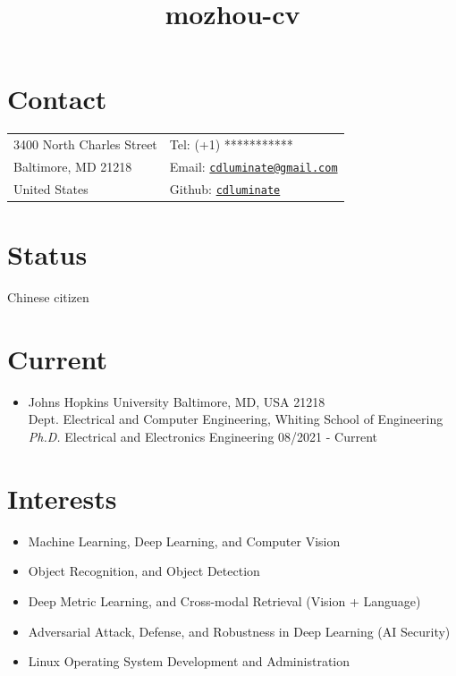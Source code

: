 \documentclass[10pt,margin,line,pifont,palatino,courier]{res}
\newcommand{\email}[1]{\href{mailto:#1}{\tt #1}}
\begin{document}
\title{mozhou-cv}
\begin{resume}

\section{\sc Contact}

\vspace{.05in}
\begin{tabular}{@{}p{2.2in}p{2.2in}}
3400 North Charles Street & Tel: (+1) *********** \\
Baltimore, MD 21218       & Email: \email{cdluminate@gmail.com}\\
United States	          & Github: \href{https://github.com/cdluminate}{\tt cdluminate}
\end{tabular}

\section{\sc Status}
Chinese citizen

\section{\sc Current}

\begin{itemize}[leftmargin=*]
\item Johns Hopkins University \hfill Baltimore, MD, USA 21218\\
    Dept. Electrical and Computer Engineering, Whiting School of Engineering\\
	\textit{Ph.D.} Electrical and Electronics Engineering \hfill 08/2021 - Current\\
\end{itemize}

\section{\sc Interests}
\begin{itemize}[noitemsep, leftmargin=*]
	\item Machine Learning, Deep Learning, and Computer Vision
	\item Object Recognition, and Object Detection
	\item Deep Metric Learning, and Cross-modal Retrieval (Vision + Language)
	\item Adversarial Attack, Defense, and Robustness in Deep Learning (AI Security)
	\item Linux Operating System Development and Administration
\end{itemize}
 

\end{resume}
\end{document}
